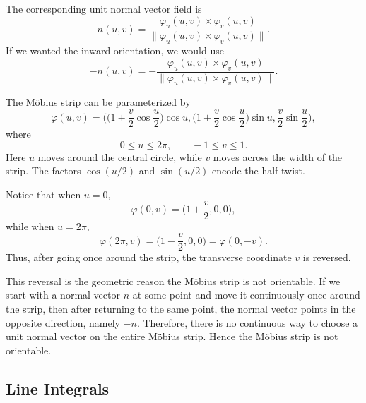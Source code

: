 \begin{example}
		The corresponding unit normal vector field is
		\begin{equation}
			n(u,v)
			=
			\frac{\varphi_u(u,v) \times \varphi_v(u,v)}
			{\|\varphi_u(u,v) \times \varphi_v(u,v)\|}.
		\end{equation}
		If we wanted the inward orientation, we would use
		\begin{equation}
			-n(u,v)
			=
			-\frac{\varphi_u(u,v) \times \varphi_v(u,v)}
			{\|\varphi_u(u,v) \times \varphi_v(u,v)\|}.
		\end{equation}
	\end{example}
			
	\begin{example}
		The M\"obius strip can be parameterized by
		\begin{equation}
			\varphi(u,v)
			=
			\bigg(
				\bigg(1 + \frac{v}{2}\cos\frac{u}{2}\bigg)\cos u,
				\bigg(1 + \frac{v}{2}\cos\frac{u}{2}\bigg)\sin u,
				\frac{v}{2}\sin\frac{u}{2}
			\bigg),
		\end{equation}
		where
		\begin{equation}
			0 \leq u \leq 2\pi,
			\qquad
			-1 \leq v \leq 1.
		\end{equation}
		Here $u$ moves around the central circle, while $v$ moves across the width
		of the strip. The factors $\cos(u/2)$ and $\sin(u/2)$ encode the half-twist.
			
		Notice that when $u = 0$,
		\begin{equation}
			\varphi(0,v)
			=
			\bigg(1+\frac{v}{2},0,0\bigg),
		\end{equation}
		while when $u = 2\pi$,
		\begin{equation}
			\varphi(2\pi,v)
			=
			\bigg(1-\frac{v}{2},0,0\bigg)
			=
			\varphi(0,-v).
		\end{equation}
		Thus, after going once around the strip, the transverse coordinate $v$ is
		reversed.
			
		This reversal is the geometric reason the M\"obius strip is not orientable. If we start with a normal vector $n$ at some point and move it continuously once around the strip, then after returning to the same point, the normal vector points in the opposite direction, namely $-n$. Therefore, there is no continuous way to choose a unit normal vector on the entire M\"obius strip. Hence the M\"obius strip is not orientable.
	\end{example}

\subsection{Line Integrals}
		
